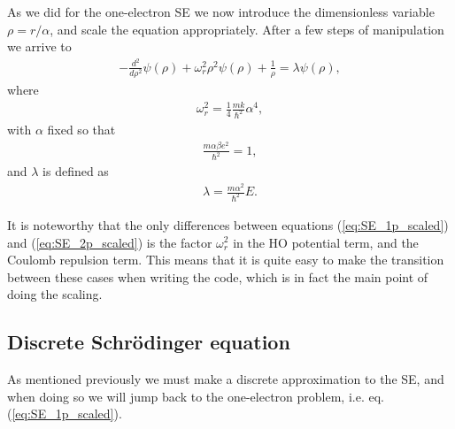 \documentclass[12pt, a4paper]{article}
\begin{document}
As we did for the one-electron SE we now introduce the dimensionless variable $\rho = r/\alpha$, and 
scale the equation appropriately. After a few steps of manipulation we arrive to   
\begin{align}
- \frac{d^2}{d\rho^2} \psi(\rho) + \omega_r^2 \rho^2 \psi(\rho) + \frac{1}{\rho} = \lambda \psi(\rho), 
\label{eq:SE_2p_scaled}
\end{align}
where 
\begin{align*}
\omega_r^2 = \frac{1}{4}\frac{mk}{\hbar^2}\alpha^4, 
\end{align*}
with $\alpha$ fixed so that 
\begin{align*}
\frac{m \alpha\beta e^2}{\hbar^2} = 1, 
\end{align*}
and $\lambda$ is defined as  
\begin{align*}
\lambda = \frac{m\alpha^2}{\hbar^2}E. 
\end{align*}

It is noteworthy that the only differences between equations (\ref{eq:SE_1p_scaled}) and 
(\ref{eq:SE_2p_scaled}) is the factor $\omega_r^2$ in the HO potential term, and the Coulomb repulsion 
term. This means that it is quite easy to make the transition between these cases when writing the code, 
which is in fact the main point of doing the scaling.    

\subsection{Discrete Schrödinger equation}

As mentioned previously we must make a discrete approximation to the SE, and when doing so we will jump 
back to the one-electron problem, i.e. eq. (\ref{eq:SE_1p_scaled}). 
\end{document}
